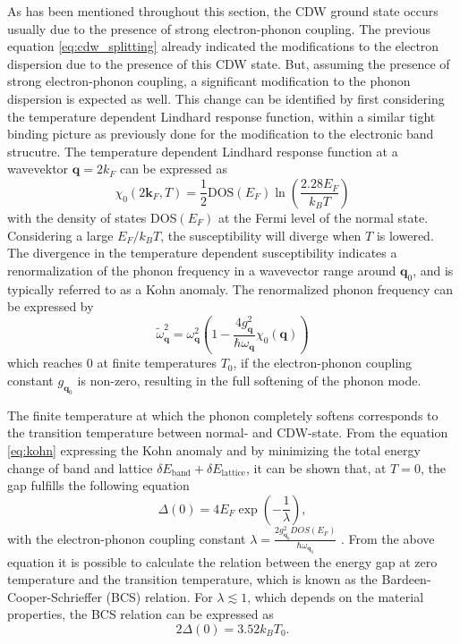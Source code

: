 As has been mentioned throughout this section, the CDW ground state occurs usually due to the presence of strong electron-phonon coupling.
The previous equation \ref{eq:cdw_splitting} already indicated the modifications to the electron dispersion due to the presence of this CDW state.
But, assuming the presence of strong electron-phonon coupling, a significant modification to the phonon dispersion is expected as well.
This change can be identified by first considering the temperature dependent Lindhard response function, within a similar tight binding picture as previously done for the modification to the electronic band strucutre.
The temperature dependent Lindhard response function at a wavevektor $\mathbf{q}=2k_F$ can be expressed as
\begin{equation}
	\chi_0 (2\mathbf{k}_F, T)=\frac{1}{2}\text{DOS}(E_F)\ln\left( \frac{2.28E_F}{k_BT}\right)
\end{equation}
with the density of states DOS$(E_F)$ at the Fermi level of the normal state.
Considering a large $E_F/k_BT$, the susceptibility will diverge when $T$ is lowered.
The divergence in the temperature dependent susceptibility indicates a renormalization of the phonon frequency in a wavevector range around $\mathbf{q}_0$, and is typically referred to as a Kohn anomaly.
The renormalized phonon frequency can be expressed by
\begin{equation}
	\widetilde{\omega}_\mathbf{q}^2 = \omega_\mathbf{q}^2 \left( 1-\frac{4g_\mathbf{q}^2}{\hbar\omega_\mathbf{q}} \chi_0(\mathbf{q}) \right)
	\label{eq:kohn}
\end{equation}
which reaches $0$ at finite temperatures $T_0$, if the electron-phonon coupling constant $g_{\mathbf{q}_0}$ is non-zero, resulting in the full softening of the phonon mode.

The finite temperature at which the phonon completely softens corresponds to the transition temperature between normal- and CDW-state.
From the equation \ref{eq:kohn} expressing the Kohn anomaly and by minimizing the total energy change of band and lattice $\delta E_\text{band}+\delta E_\text{lattice}$, it can be shown that, at $T=0$, the gap fulfills the following equation
\begin{equation}
	\Delta(0)=4E_F\exp(-\frac{1}{\lambda}),
\end{equation}
with the electron-phonon coupling constant $\lambda=\frac{2g_{\mathbf{q}_0}^2DOS(E_F)}{\hbar\omega_{\mathbf{q}_0}}$ \cite{rice_theory_1973}.
From the above equation it is possible to calculate the relation between the energy gap at zero temperature and the transition temperature, which is known as the Bardeen-Cooper-Schrieffer (BCS) relation.
For $\lambda\lesssim1$, which depends on the material properties, the BCS relation can be expressed as
\begin{equation}
	2\Delta(0)=3.52k_BT_0.
\end{equation}

